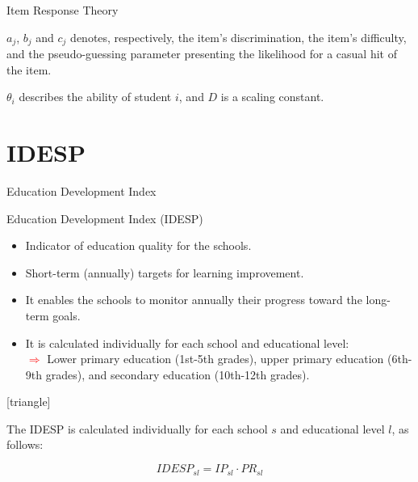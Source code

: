 \documentclass{beamer}
\begin{document}
\begin{frame}[label=IRT]{Item Response Theory}
\begin{itemize}
{\tiny\item $a_j$, $b_j$ and $c_j$ denotes, respectively, the item's discrimination, the item's difficulty, and the pseudo-guessing parameter presenting the likelihood for a casual hit of the item.}
\vspace{-8pt}
{\tiny\item $\theta_i$ describes the ability of student $i$, and $D$ is a scaling constant.}
\end{itemize}
\end{frame}



\section{IDESP}

\begin{frame}[label=IDESP]{Education Development Index}
\vspace{-42pt} \flushright \hyperlink{Mirror}{\beamerbutton{\textcolor{red}{Mirror}}}
\vspace{10pt}
\begin{block}{\centering Education Development Index (IDESP)}
 \begin{itemize}
\item [\sbt] \scriptsize Indicator of education quality for the schools.
\item [\sbt] \scriptsize Short-term (annually) targets for learning improvement.
\item [\sbt] \scriptsize It enables the schools to monitor annually their progress toward the long-term goals.
\item [\sbt] \scriptsize It is calculated individually for each school and educational level:
\\ \tiny\textcolor{red}{$\Longrightarrow$} Lower primary education (1st-5th grades), upper primary education (6th-9th grades), and secondary education (10th-12th grades).
\end{itemize}
\end{block}



\vspace{7pt}
[triangle]
\begin{itemize} 
{\scriptsize\item The IDESP is calculated individually for each school $s$ and educational level $l$, as follows:}
\end{itemize}

\begin{equation} \label{eq:IDESP}
IDESP_{sl} = IP_{sl} \cdot PR_{sl}
\end{equation}


\end{frame}
\end{document}
